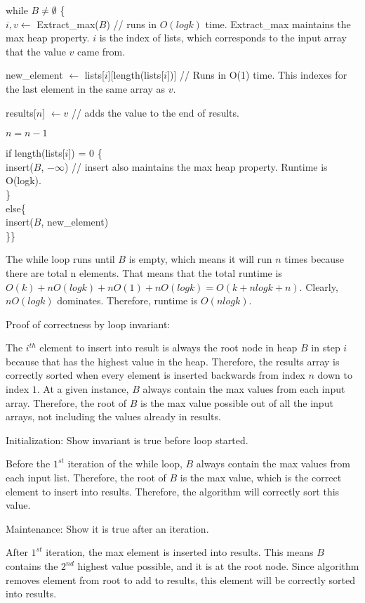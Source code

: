 \documentclass[11pt]{article}
\begin{document}
while \(B \neq \emptyset\) \{\\
\(i, v \leftarrow\) Extract\_max(\(B\)) // runs in \(O(logk)\) time.
Extract\_max maintains the max heap property. \(i\) is the index of
lists, which corresponds to the input array that the value \(v\) came
from.

new\_element \(\leftarrow\)
lists{[}\(i\){]}{[}length(lists{[}\(i\){]}){]} // Runs in O(1) time.
This indexes for the last element in the same array as \(v\).

results{[}\(n\){]} \(\leftarrow v\) // adds the value to the end of
results.

\(n=n-1\)

if length(lists{[}\(i\){]}) = 0 \{\\
insert(\(B\), \(-\infty\)) // insert also maintains the max heap
property. Runtime is O(logk).\\
\}\\
else\{\\
insert(\(B\), new\_element)\\
\}\}

    The while loop runs until \(B\) is empty, which means it will run \(n\)
times because there are total n elements. That means that the total
runtime is \(O(k) + nO(logk) + nO(1) + nO(logk) = O(k+nlogk+n)\).
Clearly, \(nO(logk)\) dominates. Therefore, runtime is \(O(nlogk)\).

    Proof of correctness by loop invariant:

The \(i^{th}\) element to insert into result is always the root node in
heap \(B\) in step \(i\) because that has the highest value in the heap.
Therefore, the results array is correctly sorted when every element is
inserted backwards from index \(n\) down to index \(1\). At a given
instance, \(B\) always contain the max values from each input array.
Therefore, the root of \(B\) is the max value possible out of all the
input arrays, not including the values already in results.

Initialization: Show invariant is true before loop started.

Before the \(1^{st}\) iteration of the while loop, \(B\) always contain
the max values from each input list. Therefore, the root of \(B\) is the
max value, which is the correct element to insert into results.
Therefore, the algorithm will correctly sort this value.

Maintenance: Show it is true after an iteration.

After \(1^{st}\) iteration, the max element is inserted into results.
This means \(B\) contains the \(2^{nd}\) highest value possible, and it
is at the root node. Since algorithm removes element from root to add to
results, this element will be correctly sorted into results.
\end{document}
